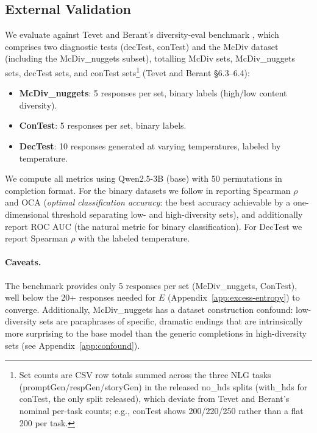 \subsection{External Validation}\label{sec:tevet}

We evaluate against Tevet and Berant's diversity-eval benchmark \citep{tevet2020evaluating}, which comprises two diagnostic tests (decTest, conTest) and the McDiv dataset (including the McDiv\_nuggets subset), totalling \tevetMcDivSetCount{} McDiv sets, \tevetMcDivNugSetCount{} McDiv\_nuggets sets, \tevetDecTestSetCount{} decTest sets, and \tevetConTestSetCount{} conTest sets\footnote{Set counts are CSV row totals summed across the three NLG tasks (promptGen/respGen/storyGen) in the released no\_hds splits (with\_hds for conTest, the only split released), which deviate from Tevet and Berant's nominal per-task counts; e.g., conTest shows 200/220/250 rather than a flat 200 per task.} (Tevet and Berant \S6.3--6.4):
\begin{itemize}[nosep]
    \item \textbf{McDiv\_nuggets}: 5 responses per set, binary labels (high/low content diversity).
    \item \textbf{ConTest}: 5 responses per set, binary labels.
    \item \textbf{DecTest}: 10 responses generated at varying temperatures, labeled by temperature.
\end{itemize}
We compute all metrics using Qwen2.5-3B (base) with 50 permutations in completion format.
For the binary datasets we follow \citet{tevet2020evaluating} in reporting Spearman $\rho$ and OCA (\emph{optimal classification accuracy}: the best accuracy achievable by a one-dimensional threshold separating low- and high-diversity sets), and additionally report ROC AUC (the natural metric for binary classification).
For DecTest we report Spearman $\rho$ with the labeled temperature.

\paragraph{Caveats.} The benchmark provides only 5 responses per set (McDiv\_nuggets, ConTest), well below the 20+ responses needed for $E$ (Appendix~\ref{app:excess-entropy}) to converge.
Additionally, McDiv\_nuggets has a dataset construction confound: low-diversity sets are paraphrases of specific, dramatic endings that are intrinsically more surprising to the base model than the generic completions in high-diversity sets (see Appendix~\ref{app:confound}).

